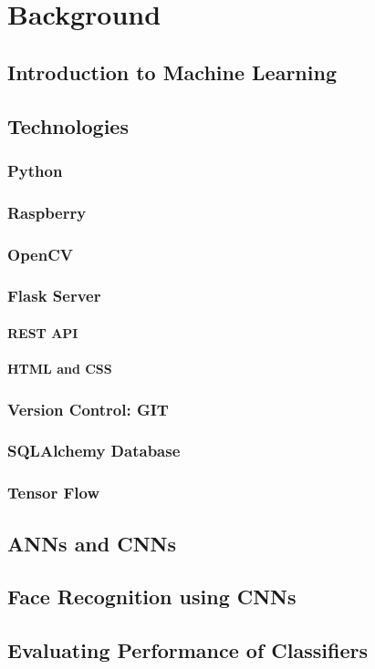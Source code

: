 \chapter{Background}
\label{background}

\section{Introduction to Machine Learning}
\section{Technologies}
	\subsection{Python}	%
	\subsection{Raspberry}
	\subsection{OpenCV}
	\subsection{Flask Server}
		\subsubsection{REST API}
		\subsubsection{HTML and CSS}
	\subsection{Version Control: GIT}	%
	\subsection{SQLAlchemy Database}
	\subsection{Tensor Flow}	%
\section{ANNs and CNNs}
\section{Face Recognition using CNNs}
\section{Evaluating Performance of Classifiers}
